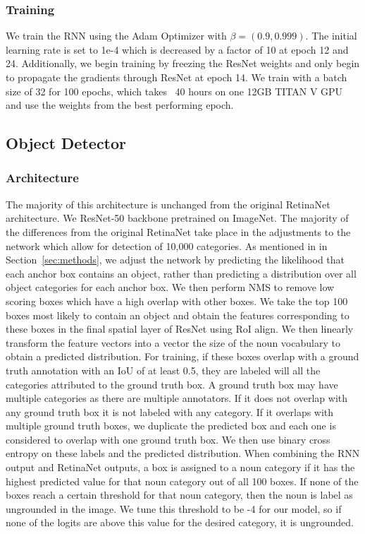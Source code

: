\documentclass[runningheads]{llncs}
\begin{document}
\subsubsection{Training} We train the RNN using the Adam Optimizer \cite{KingmaAndBa2015} with $\beta=(0.9, 0.999)$. The initial learning rate is set to 1e-4 which is decreased by a factor of 10 at epoch 12 and 24. Additionally, we begin training by freezing the ResNet weights and only begin to propagate the gradients through ResNet at epoch 14. We train with a batch size of 32 for 100 epochs, which takes ~40 hours on one 12GB TITAN V GPU and use the weights from the best performing epoch. 

\subsection{Object Detector}
\subsubsection{Architecture}
The majority of this architecture is unchanged from the original RetinaNet architecture. We ResNet-50 backbone pretrained on ImageNet. The majority of the differences from the original RetinaNet take place in the adjustments to the network which allow for detection of 10,000 categories. As mentioned in in Section~\ref{sec:methods}, we adjust the network by predicting the likelihood that each anchor box contains an object, rather than predicting a distribution over all object categories for each anchor box. We then perform NMS to remove low scoring boxes which have a high overlap with other boxes. We take the top 100 boxes most likely to contain an object and obtain the features corresponding to these boxes in the final spatial layer of ResNet using RoI align. We then linearly transform the feature vectors into a vector the size of the noun vocabulary to obtain a predicted distribution. For training, if these boxes overlap with a ground truth annotation with an IoU of at least 0.5, they are labeled will all the categories attributed to the ground truth box. A ground truth box may have multiple categories as there are multiple annotators. If it does not overlap with any ground truth box it is not labeled with any category. If it overlaps with multiple ground truth boxes, we duplicate the predicted box and each one is considered to overlap with one ground truth box. We then use binary cross entropy on these labels and the predicted distribution. When combining the RNN output and RetinaNet outputs, a box is assigned to a noun category if it has the highest predicted value for that noun category out of all 100 boxes. If none of the boxes reach a certain threshold for that noun category, then the noun is label as ungrounded in the image. We tune this threshold to be -4 for our model, so if none of the logits are above this value for the desired category, it is ungrounded. 
\end{document}
